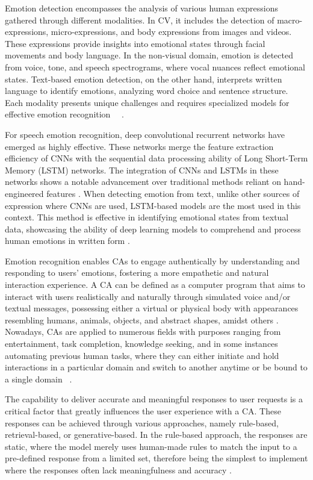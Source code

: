 \documentclass[runningheads]{llncs}
\begin{document}
Emotion detection encompasses the analysis of various human expressions gathered through different modalities. In CV, it includes the detection of macro-expressions, micro-expressions, and body expressions from images and videos. These expressions provide insights into emotional states through facial movements and body language. In the non-visual domain, emotion is detected from voice, tone, and speech spectrograms, where vocal nuances reflect emotional states. Text-based emotion detection, on the other hand, interprets written language to identify emotions, analyzing word choice and sentence structure. Each modality presents unique challenges and requires specialized models for effective emotion recognition \cite{Chul2018}~\cite{Trigeorgis2016}~\cite{Karna2020}.

For speech emotion recognition, deep convolutional recurrent networks have emerged as highly effective. These networks merge the feature extraction efficiency of CNNs with the sequential data processing ability of Long Short-Term Memory (LSTM) networks. The integration of CNNs and LSTMs in these networks shows a notable advancement over traditional methods reliant on hand-engineered features \cite{Trigeorgis2016}. When detecting emotion from text, unlike other sources of expression where CNNs are used, LSTM-based models are the most used in this context. This method is effective in identifying emotional states from textual data, showcasing the ability of deep learning models to comprehend and process human emotions in written form \cite{Karna2020}.

Emotion recognition enables CAs to engage authentically by understanding and responding to users' emotions, fostering a more empathetic and natural interaction experience. A CA  can be defined as a computer program that aims to interact with users realistically and naturally through simulated voice and/or textual messages, possessing either a virtual or physical body with appearances resembling humans, animals, objects, and abstract shapes, amidst others \cite{aljaroodi_avatars_2019}. Nowadays, CAs are applied to numerous fields with purposes ranging from entertainment, task completion, knowledge seeking, and in some instances automating previous human tasks, where they can either initiate and hold interactions in a particular domain and switch to another anytime or be bound to a single domain \cite{fernandes_survey_2020}~\cite{ramesh_survey_2017}.

The capability to deliver accurate and meaningful responses to user requests is a critical factor that greatly influences the user experience with a CA. These responses can be achieved through various approaches, namely rule-based, retrieval-based, or generative-based. In the rule-based approach, the responses are static, where the model merely uses human-made rules to match the input to a pre-defined response from a limited set, therefore being the simplest to implement where the responses often lack meaningfulness and accuracy \cite{mohamad_suhaili_service_2021}. 
\end{document}
